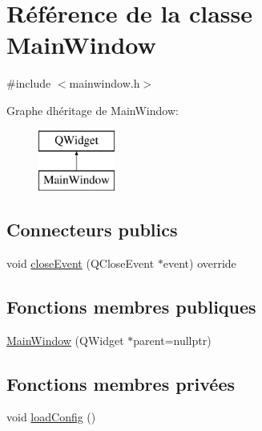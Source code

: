 \hypertarget{class_main_window}{}\section{Référence de la classe Main\+Window}
\label{class_main_window}


{\ttfamily \#include $<$mainwindow.\+h$>$}

Graphe d\textquotesingle{}héritage de Main\+Window\+:\begin{figure}[H]
\begin{center}
\leavevmode
\includegraphics[height=2.000000cm]{class_main_window}
\end{center}
\end{figure}
\subsection*{Connecteurs publics}
\begin{DoxyCompactItemize}
\item 
void \mbox{\hyperlink{class_main_window_a05fb9d72c044aa3bb7d187b994704e2f}{close\+Event}} (Q\+Close\+Event $\ast$event) override
\end{DoxyCompactItemize}
\subsection*{Fonctions membres publiques}
\begin{DoxyCompactItemize}
\item 
\mbox{\hyperlink{class_main_window_a996c5a2b6f77944776856f08ec30858d}{Main\+Window}} (Q\+Widget $\ast$parent=nullptr)
\end{DoxyCompactItemize}
\subsection*{Fonctions membres privées}
\begin{DoxyCompactItemize}
\item 
void \mbox{\hyperlink{class_main_window_a2a947444fcfc921b5d237c706024891d}{load\+Config}} ()
\end{DoxyCompactItemize}
